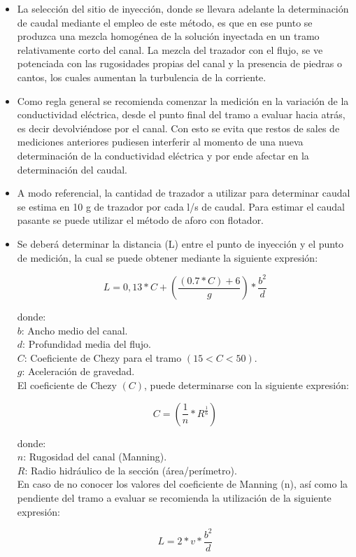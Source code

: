 \documentclass[]{article}
\providecommand{\tightlist}{%
  \setlength{\itemsep}{0pt}\setlength{\parskip}{0pt}}
\begin{document}
\begin{itemize}
\tightlist
\item La selección del sitio de inyección, donde se llevara adelante la determinación de caudal mediante el empleo de este método, es que en ese punto se produzca una mezcla homogénea de la solución inyectada en un tramo relativamente corto del canal. La mezcla del trazador con el flujo, se ve potenciada con las rugosidades propias del canal y la presencia de piedras o cantos, los cuales aumentan la turbulencia de la corriente.
\item Como regla general se recomienda comenzar la medición en la variación de la conductividad eléctrica, desde el punto final del tramo a evaluar hacia atrás, es decir devolviéndose por el canal. Con esto se evita que restos de sales de mediciones anteriores pudiesen interferir al momento de una nueva determinación de la conductividad eléctrica y por ende afectar en la determinación del caudal.
\item A modo referencial, la cantidad de trazador a utilizar para determinar caudal se estima en 10 g de trazador por cada l/s de caudal. Para estimar el caudal pasante se puede utilizar el método de aforo con flotador.
\item Se deberá determinar la distancia (L) entre el punto de inyección y el punto de medición, la cual se puede obtener mediante la siguiente expresión:

\[L=0,13*C+\left(\frac{(0.7*C)+6}{g}\right)*\frac{b^2}{d}\]

donde:\\
\(b\): Ancho medio del canal.\\
\(d\): Profundidad media del flujo.\\
\(C\): Coeficiente de Chezy para el tramo $(15<C<50)$.\\
\(g\): Aceleración de gravedad.\\
El coeficiente de Chezy $(C)$, puede determinarse con la siguiente expresión:

\[C=\left(\frac{1}{n}*R^\frac{1}{6}\right)\]

donde:\\
\(n\): Rugosidad del canal (Manning).\\
\(R\): Radio hidráulico de la sección (área/perímetro).\\
En caso de no conocer los valores del coeficiente de Manning (n), así como la pendiente
del tramo a evaluar se recomienda la utilización de la siguiente expresión:

\[L=2*v*\frac{b^2}{d}\]


\end{itemize}
\end{document}
